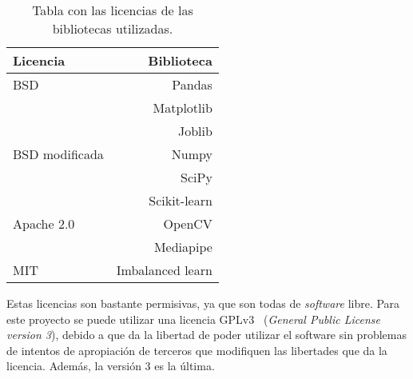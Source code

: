\begin{table}[h]
	\begin{center}
		\begin{tabular}{ l r }
			\toprule
			\textbf{Licencia} & \textbf{Biblioteca} \\ \midrule
			BSD & Pandas \\
			& Matplotlib \\
			& Joblib \\ \midrule
			BSD modificada & Numpy \\ 
			& SciPy \\
			& Scikit-learn \\ \midrule
			Apache 2.0 & OpenCV \\ 
			& Mediapipe \\ \midrule
			MIT & Imbalanced learn \\ \bottomrule
		\end{tabular}
		\caption{Tabla con las licencias de las bibliotecas utilizadas.}
		\label{tab:licencias_bib}
	\end{center}
\end{table}

Estas licencias son bastante permisivas, ya que son todas de \textit{software} libre. Para este proyecto se puede utilizar una licencia GPLv3~\cite{wiki:gpl} (\textit{General Public License version 3}), debido a que da la libertad de poder utilizar el software sin problemas de intentos de apropiación de terceros que modifiquen las libertades que da la licencia. Además, la versión 3 es la última.
